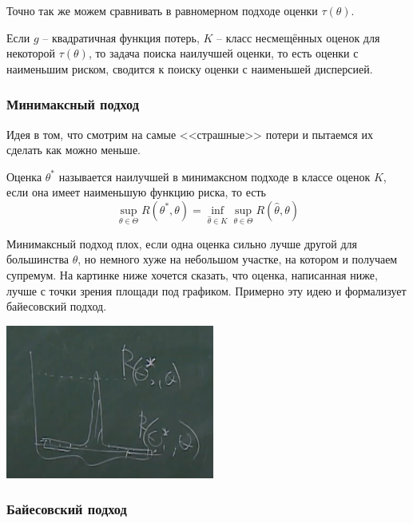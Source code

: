 \begin{note}
    Точно так же можем сравнивать в равномерном подходе оценки $\tau(\theta)$.
\end{note}

\begin{note}
    Если $g$ -- квадратичная функция потерь, $K$ -- класс несмещённых оценок для некоторой $\tau(\theta)$, то задача поиска наилучшей оценки, то есть оценки с наименьшим риском, сводится к поиску оценки с наименьшей дисперсией.
\end{note}

\subsubsection{Минимаксный подход}

\begin{note}
    Идея в том, что смотрим на самые <<страшные>> потери и пытаемся их сделать как можно меньше.
\end{note}

\begin{definition}
    Оценка $\theta^*$ называется наилучшей в минимаксном подходе в классе оценок $K$, если она имеет наименьшую функцию риска, то есть
    \[
        \sup_{\theta \in \Theta} R(\theta^*, \theta) = \inf_{\hat{\theta} \in K} \sup_{\theta \in \Theta} R(\hat{\theta}, \theta)
    \]
\end{definition}

\begin{note}
    Минимаксный подход плох, если одна оценка сильно лучше другой для большинства $\theta$, но немного хуже на небольшом участке, на котором и получаем супремум. На картинке ниже хочется сказать, что оценка, написанная ниже, лучше с точки зрения площади под графиком. Примерно эту идею и формализует байесовский подход.

    \includegraphics{images/picture1.png}
\end{note}

\subsubsection{Байесовский подход}

